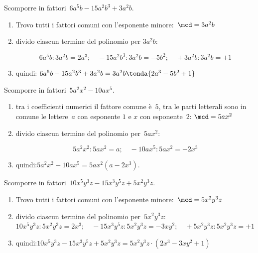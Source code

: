 \begin{esempio}{}{}
Scomporre in fattori~\(6a^{5}b-15a^{2}b^{3}+3a^2b\).
\begin{enumerate} [left=0mm, noitemsep]
\item Trovo tutti i fattori comuni con l'esponente 
minore:~\(\mcd=3a^2b\)
\item divido ciascun termine del polinomio per \(3a^2b\):

\vspace{-2em}
\[6a^{5}b : 3a^2b = 2a^{3}; \quad 
  -15a^{2}b^{3} : 3a^2b = -5b^{2}; \quad 
  +3a^2b : 3a^2b = +1\]
\vspace{-2em}
\item quindi:\quad 
\(6a^{5}b-15a^{2}b^{3}+3a^2b=3a^{2}b\tonda{2a^{3}-5b^{2}+1}\)
\end{enumerate}
\end{esempio}

\begin{esempio}{}{}
Scomporre in fattori~\(5a^{2}x^2-10ax^{5}\).
\begin{enumerate} [left=0mm, noitemsep]
\item tra i coefficienti numerici il fattore comune è~\(5\), 
tra le parti letterali sono in comune le lettere~\(a\) con esponente 
\(1\) e \(x\) con esponente~\(2\): \quad \(\mcd=5ax^2\)
\item divido ciascun termine del polinomio per~\(5ax^2\):

\vspace{-1.2em}
\[5a^{2}x^2:5ax^2=a; \quad -10ax^{5}:5ax^2=-2x^3\]
\vspace{-1.6em}
\item quindi:\quad \(5a^{2}x^2-10ax^{5}=5ax^2(a-2x^3)\).
\end{enumerate}
\end{esempio}

\begin{esempio}{}{}
Scomporre in fattori~\(10x^{5}y^{3}z-15x^3y^{5}z+5x^2y^{3}z\).
\begin{enumerate} [left=0mm, noitemsep]
\item Trovo tutti i fattori comuni con l'esponente 
minore:~\(\mcd=5x^2y^{3}z\)
\item divido ciascun termine del polinomio per~\(5x^2y^{3}z\):\\[.2em]
\hspace*{-8mm} {\small 
\(10x^{5}y^{3}z:5x^2y^{3}z=2x^3; \quad
-15x^3y^{5}z:5x^2y^{3}z=-3xy^{2}; \quad
+5x^2y^{3}z:5x^2y^{3}z=+1\)
}\\[-.7em]
\item quindi:\quad \(10x^{5}y^{3}z-15x^3y^{5}z+5x^2y^{3}z =
5x^2y^{3}z \cdot (2x^3-3xy^{2}+1)\)
\end{enumerate}
\end{esempio}

